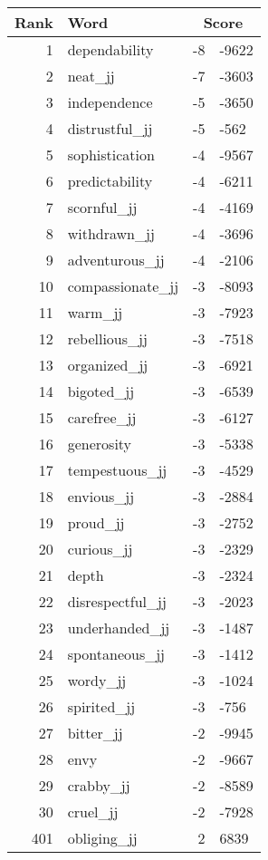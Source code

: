 \begin{longtable}[!htbp]{| rlr@{.}l |}
    \hline
    \textbf{Rank} & \textbf{Word} & \multicolumn{2}{c|}{\textbf{Score}} \\
    \hline
    \endhead
    1 & dependability & -8 & -9622 \\
    2 & neat\_jj & -7 & -3603 \\
    3 & independence & -5 & -3650 \\
    4 & distrustful\_jj & -5 & -562 \\
    5 & sophistication & -4 & -9567 \\
    6 & predictability & -4 & -6211 \\
    7 & scornful\_jj & -4 & -4169 \\
    8 & withdrawn\_jj & -4 & -3696 \\
    9 & adventurous\_jj & -4 & -2106 \\
    10 & compassionate\_jj & -3 & -8093 \\
    11 & warm\_jj & -3 & -7923 \\
    12 & rebellious\_jj & -3 & -7518 \\
    13 & organized\_jj & -3 & -6921 \\
    14 & bigoted\_jj & -3 & -6539 \\
    15 & carefree\_jj & -3 & -6127 \\
    16 & generosity & -3 & -5338 \\
    17 & tempestuous\_jj & -3 & -4529 \\
    18 & envious\_jj & -3 & -2884 \\
    19 & proud\_jj & -3 & -2752 \\
    20 & curious\_jj & -3 & -2329 \\
    21 & depth & -3 & -2324 \\
    22 & disrespectful\_jj & -3 & -2023 \\
    23 & underhanded\_jj & -3 & -1487 \\
    24 & spontaneous\_jj & -3 & -1412 \\
    25 & wordy\_jj & -3 & -1024 \\
    26 & spirited\_jj & -3 & -756 \\
    27 & bitter\_jj & -2 & -9945 \\
    28 & envy & -2 & -9667 \\
    29 & crabby\_jj & -2 & -8589 \\
    30 & cruel\_jj & -2 & -7928 \\
    401 & obliging\_jj & 2 & 6839 \\

\end{longtable}
